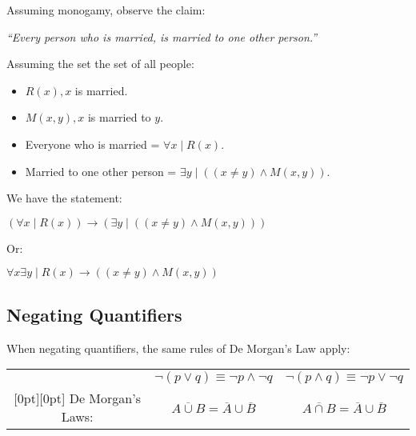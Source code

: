 \noindent
Assuming monogamy, observe the claim:

\begin{center}
    \Large
    \textit{``Every person who is married, is married to one other person.''}
\end{center}


Assuming the set the set of all people:
\begin{itemize}
    \item $R(x), x$ is married.
    \item $M(x, y), x$ is married to $y$.
    \item Everyone who is married = $\forall x \mid R(x)$.
    \item Married to one other person = $\exists y \mid ((x\neq y) \land M(x, y))$.
\end{itemize}

\noindent
We have the statement:

\begin{center}
    \Large
    $(\forall x \mid R(x)) \rightarrow (\exists y \mid ((x\neq y) \land M(x, y)))$
\end{center}

\noindent
Or:

\begin{center}
    \Large
    $\forall x \exists y \mid R(x) \rightarrow ((x\neq y) \land M(x, y))$
\end{center}

\newpage

\subsection*{Negating Quantifiers}
When negating quantifiers, the same rules of De Morgan's Law apply:\\

\begin{tabular}{|c|c|c|}
    \hline
    \cellcolor{OliveGreen!10}\multirow{2}{*}                                                & $\neg(p\lor q) \equiv \neg p \land \neg q$             &
    $\neg(p\land q) \equiv \neg p \lor \neg q$
    \\
    \cellcolor{OliveGreen!10}\raisebox{.8\normalbaselineskip}[0pt][0pt] {De Morgan's Laws:} & $\overline{A\cup B} =  \overline{A} \cup \overline{B}$ &
    $\overline{A\cap B} = \overline{A} \cup \overline{B}$                                                                                              \\
    \hline
\end{tabular}

